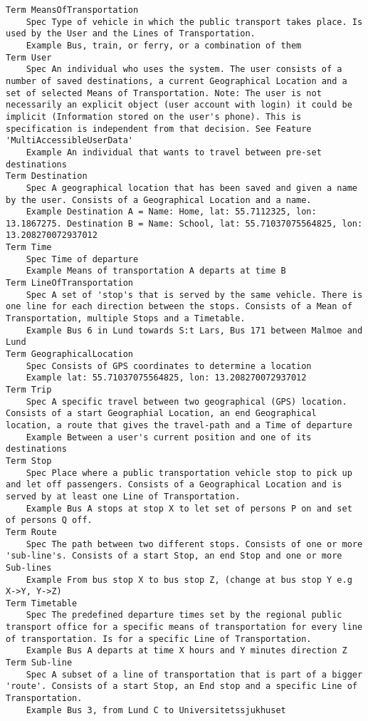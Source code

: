 

\begin{lstlisting}
Term MeansOfTransportation
	Spec Type of vehicle in which the public transport takes place. Is used by the User and the Lines of Transportation.
	Example Bus, train, or ferry, or a combination of them
Term User
	Spec An individual who uses the system. The user consists of a number of saved destinations, a current Geographical Location and a set of selected Means of Transportation. Note: The user is not necessarily an explicit object (user account with login) it could be implicit (Information stored on the user's phone). This is specification is independent from that decision. See Feature 'MultiAccessibleUserData'
	Example An individual that wants to travel between pre-set destinations
Term Destination
	Spec A geographical location that has been saved and given a name by the user. Consists of a Geographical Location and a name.
	Example Destination A = Name: Home, lat: 55.7112325, lon: 13.1867275. Destination B = Name: School, lat: 55.71037075564825, lon: 13.208270072937012
Term Time
	Spec Time of departure
	Example Means of transportation A departs at time B
Term LineOfTransportation
	Spec A set of 'stop's that is served by the same vehicle. There is one line for each direction between the stops. Consists of a Mean of Transportation, multiple Stops and a Timetable.
	Example Bus 6 in Lund towards S:t Lars, Bus 171 between Malmoe and Lund
Term GeographicalLocation
	Spec Consists of GPS coordinates to determine a location
	Example lat: 55.71037075564825, lon: 13.208270072937012
Term Trip
	Spec A specific travel between two geographical (GPS) location. Consists of a start Geographial Location, an end Geographical location, a route that gives the travel-path and a Time of departure
	Example Between a user's current position and one of its destinations
Term Stop
	Spec Place where a public transportation vehicle stop to pick up and let off passengers. Consists of a Geographical Location and is served by at least one Line of Transportation.
	Example Bus A stops at stop X to let set of persons P on and set of persons Q off.
Term Route
	Spec The path between two different stops. Consists of one or more 'sub-line's. Consists of a start Stop, an end Stop and one or more Sub-lines
	Example From bus stop X to bus stop Z, (change at bus stop Y e.g X->Y, Y->Z)
Term Timetable
	Spec The predefined departure times set by the regional public transport office for a specific means of transportation for every line of transportation. Is for a specific Line of Transportation.
	Example Bus A departs at time X hours and Y minutes direction Z
Term Sub-line
	Spec A subset of a line of transportation that is part of a bigger 'route'. Consists of a start Stop, an End stop and a specific Line of Transportation.	
	Example Bus 3, from Lund C to Universitetssjukhuset

\end{lstlisting}